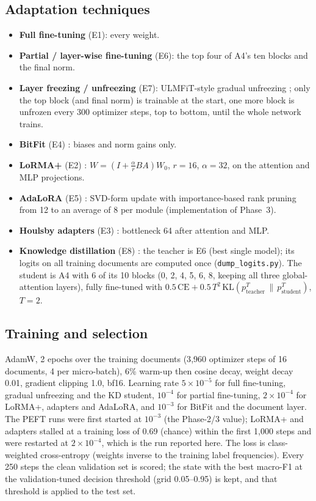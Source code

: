 \documentclass[11pt,a4paper]{article}
\newcommand{\code}[1]{\texttt{\small #1}}
\begin{document}
\subsection{Adaptation techniques}
\begin{itemize}
  \item \textbf{Full fine-tuning} (E1): every weight.
  \item \textbf{Partial / layer-wise fine-tuning} (E6): the top four of A4's ten blocks and the final norm.
  \item \textbf{Layer freezing / unfreezing} (E7): ULMFiT-style gradual unfreezing \cite{howard2018ulmfit}; only
  the top block (and final norm) is trainable at the start, one more block is unfrozen every 300 optimizer
  steps, top to bottom, until the whole network trains.
  \item \textbf{BitFit} (E4) \cite{benzaken2022bitfit}: biases and norm gains only.
  \item \textbf{LoRMA+} (E2) \cite{bihany2025lorma}: $W=(I+\frac{\alpha}{r}BA)W_0$, $r=16$, $\alpha=32$, on the
  attention and MLP projections.
  \item \textbf{AdaLoRA} (E5) \cite{zhang2023adalora}: SVD-form update with importance-based rank pruning from 12
  to an average of 8 per module (implementation of Phase~3).
  \item \textbf{Houlsby adapters} (E3) \cite{houlsby2019adapters}: bottleneck 64 after attention and MLP.
  \item \textbf{Knowledge distillation} (E8) \cite{hinton2015kd}: the teacher is E6 (best single model); its
  logits on all \ntrain{} training documents are computed once (\code{dump\_logits.py}).  The student is A4 with
  6 of its 10 blocks (0, 2, 4, 5, 6, 8, keeping all three global-attention layers), fully fine-tuned with
  $0.5\,\mathrm{CE} + 0.5\,T^2\,\mathrm{KL}(p^T_\text{teacher}\,\|\,p^T_\text{student})$, $T=2$.
\end{itemize}

\subsection{Training and selection}\label{sec:train}
AdamW, 2 epochs over the \ntrain{} training documents (3{,}960 optimizer steps of 16 documents, 4 per
micro-batch), 6\% warm-up then cosine decay, weight decay 0.01, gradient clipping 1.0, bf16.  Learning rate
$5\times10^{-5}$ for full fine-tuning, gradual unfreezing and the KD student, $10^{-4}$ for partial
fine-tuning, $2\times10^{-4}$ for LoRMA+, adapters and AdaLoRA, and $10^{-3}$ for BitFit and the document
layer.  The PEFT runs were first started at $10^{-3}$ (the Phase-2/3 value); LoRMA+ and adapters stalled at a
training loss of 0.69 (chance) within the first 1{,}000 steps and were restarted at $2\times10^{-4}$, which is
the run reported here.  The loss is class-weighted cross-entropy (weights inverse to the training label
frequencies).  Every 250 steps the clean validation set is scored; the state with the best macro-F1 at the
validation-tuned decision threshold (grid 0.05--0.95) is kept, and that threshold is applied to the test set.
\end{document}
